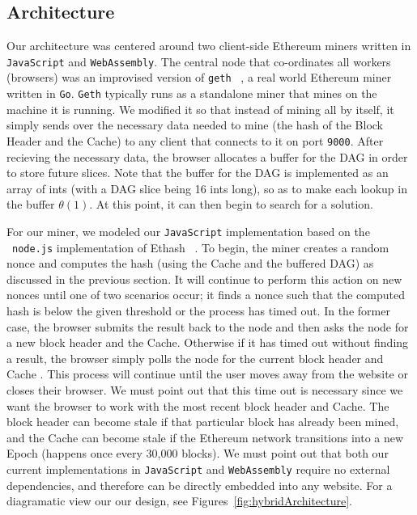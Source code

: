 \documentclass[runningheads]{llncs}
\begin{document}
\subsection{Architecture}

Our architecture was centered around two client-side Ethereum miners written in \verb|JavaScript| and \verb|WebAssembly|. The central node that co-ordinates all workers (browsers) was an improvised version of \verb|geth| ~\cite{geth}, a real world Ethereum miner written in \verb|Go|. \verb|Geth| typically runs as a standalone miner that mines on the machine it is running. We modified it so that instead of mining all by itself, it simply sends over the necessary data needed to mine (the hash of the Block Header and the Cache) to any client that connects to it on port \verb|9000|. After recieving the necessary data, the browser allocates a buffer for the DAG in order to store future slices. Note that the buffer for the DAG is implemented as an array of ints (with a DAG slice being 16 ints long), so as to make each lookup in the buffer $\theta(1)$. At this point, it can then begin to search for a solution. 

For our miner, we modeled our \verb|JavaScript| implementation based on the ~\verb|node.js| implementation of Ethash ~\cite{ethash}. To begin, the miner creates a random nonce and computes the hash (using the Cache and the buffered DAG) as discussed in the previous section. It will continue to perform this action on new nonces until one of two scenarios occur; it finds a nonce such that the computed hash is below the given threshold or the process has timed out. In the former case, the browser submits the result back to the node and then asks the node for a new block header and the Cache. Otherwise if it has timed out without finding a result, the browser simply polls the node for the current block header and Cache . This process will continue until the user moves away from the website or closes their browser. 
We must point out that this time out is necessary since we want the browser to work with the most recent block header and Cache. The block header can become stale if that particular block has already been mined, and the Cache can become stale if the Ethereum network transitions into a new Epoch (happens once every 30,000 blocks). 
We must point out that both our current implementations in \verb|JavaScript| and \verb|WebAssembly| require no external dependencies, and therefore can be directly embedded into any website. For a diagramatic view our our design, see Figures~\ref{fig:hybridArchitecture}.
\end{document}
